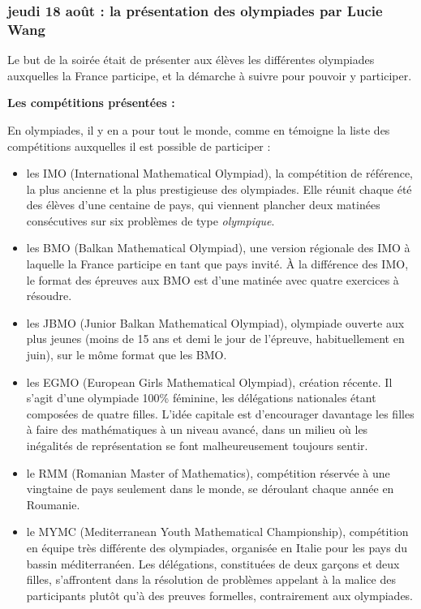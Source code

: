 \subsubsection{jeudi 18 août : la pr\'esentation des olympiades par Lucie Wang}

Le but de la soir\'ee \'etait de pr\'esenter aux \'el\`eves les diff\'erentes olympiades auxquelles la France participe, et la d\'emarche \`a suivre pour pouvoir y participer.

\bigskip

\textbf{Les comp\'etitions pr\'esent\'ees :}

\smallskip

En olympiades, il y en a pour tout le monde, comme en t\'emoigne la liste des comp\'etitions auxquelles il est possible de participer :
\begin{itemize}
    \item les IMO (International Mathematical Olympiad), la comp\'etition de r\'ef\'erence, la plus ancienne et la plus prestigieuse des olympiades. Elle r\'eunit chaque \'et\'e des \'el\`eves d'une centaine de pays, qui viennent plancher deux matin\'ees cons\'ecutives sur six probl\`emes de type \textit{olympique}.
    \item les BMO (Balkan Mathematical Olympiad), une version r\'egionale des IMO \`a laquelle la France participe en tant que pays invit\'e. \`A la diff\'erence des IMO, le format des \'epreuves aux BMO est d'une matin\'ee avec quatre exercices \`a r\'esoudre.
    \item les JBMO (Junior Balkan Mathematical Olympiad), olympiade ouverte aux plus jeunes (moins de 15 ans et demi le jour de l’\'epreuve, habituellement en juin), sur le m\^ome format que les BMO.
    \item les EGMO (European Girls Mathematical Olympiad), cr\'eation r\'ecente. Il s'agit d'une olympiade 100\% f\'eminine, les d\'el\'egations nationales \'etant compos\'ees de quatre filles. L'id\'ee capitale est d'encourager davantage les filles \`a faire des math\'ematiques \`a un niveau avanc\'e, dans un milieu o\`u les in\'egalit\'es de repr\'esentation se font malheureusement toujours sentir.
    \item le RMM (Romanian Master of Mathematics), comp\'etition r\'eserv\'ee \`a une vingtaine de pays seulement dans le monde, se d\'eroulant chaque ann\'ee en Roumanie.
    \item le MYMC (Mediterranean Youth Mathematical Championship), comp\'etition en \'equipe tr\`es diff\'erente des olympiades, organis\'ee en Italie pour les pays du bassin m\'editerran\'een. Les d\'el\'egations, constitu\'ees de deux gar\c{c}ons et deux filles, s'affrontent dans la r\'esolution de probl\`emes appelant \`a la malice des participants plut\^ot qu'\`a des preuves formelles, contrairement aux olympiades.
\end{itemize}

